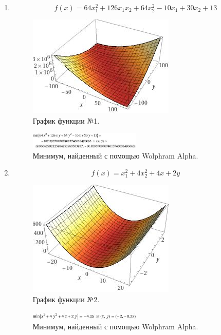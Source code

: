 \documentclass[12pt]{article}
\begin{document}
\begin{enumerate}

\item \[ f(x) = 64x_1^2 + 126x_1x_2 + 64x_2^2 - 10x_1 + 30x_2 + 13 \]
\begin{figure}[H]
	\centering
	\includegraphics[scale=0.5]{img/func1_plot.jpeg}
	\caption{График функции №1.}
\end{figure}

\begin{figure}[H]
	\centering
	\includegraphics[width=0.5\textwidth]{img/func1_min.jpeg}
	\caption{Минимум, найденный с помощью Wolphram Alpha.}
\end{figure}

\item \[ f(x) = x_1^2+4x_2^2+4x+2y \]
\begin{figure}[H]
	\centering
	\includegraphics[scale=0.5]{img/func2_plot.jpeg}
	\caption{График функции №2.}
\end{figure}

\begin{figure}[H]
	\centering
	\includegraphics[width=0.5\textwidth]{img/func2_min.jpeg}
	\caption{Минимум, найденный с помощью Wolphram Alpha.}
\end{figure}


\end{enumerate}
\end{document}
